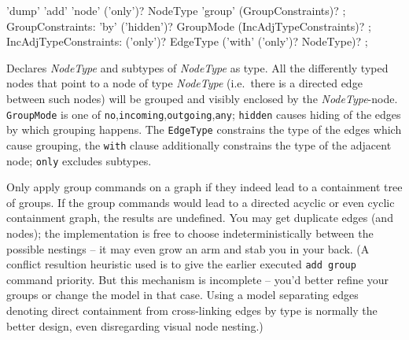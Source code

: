 \begin{rail}
  'dump' 'add' 'node' ('only')? NodeType 'group' (GroupConstraints)? ;
GroupConstraints:
  'by' ('hidden')? GroupMode (IncAdjTypeConstraints)? ;
IncAdjTypeConstraints:
  ('only')? EdgeType ('with' ('only')? NodeType)? ;
\end{rail}
Declares \emph{NodeType} and subtypes of \emph{NodeType} as  type.
All the differently typed nodes that point to a node of type \emph{NodeType} 
(i.e.\ there is a directed edge between such nodes) will be grouped and visibly enclosed by the \emph{NodeType}-node.
\texttt{GroupMode} is one of \texttt{no},\texttt{incoming},\texttt{outgoing},\texttt{any}; \texttt{hidden} causes hiding of the edges by which grouping happens.
The \texttt{EdgeType} constrains the type of the edges which cause grouping, the \texttt{with} clause additionally constrains the type of the adjacent node; 
\texttt{only} excludes subtypes.

\begin{note}
Only apply group commands on a graph if they indeed lead to a containment tree of groups.
If the group commands would lead to a directed acyclic or even cyclic containment graph, the results are undefined.
You may get duplicate edges (and nodes); the implementation is free to choose indeterministically between the possible nestings -- it may even grow an arm and stab you in your back.
(A conflict resultion heuristic used is to give the earlier executed \texttt{add group} command priority. 
But this mechanism is incomplete -- you'd better refine your groups or change the model in that case.
Using a model separating edges denoting direct containment from cross-linking edges by type is normally the better design, even disregarding visual node nesting.)
\end{note}

